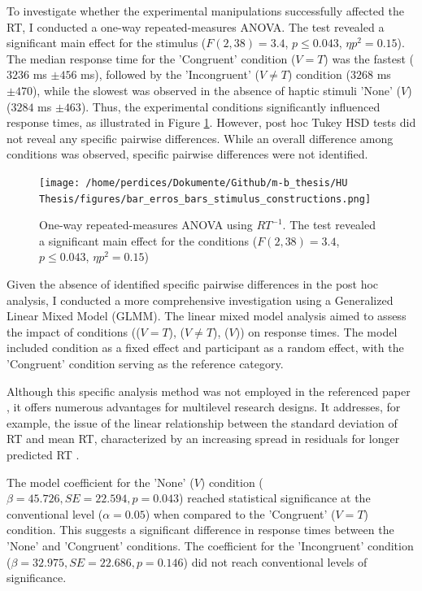 \documentclass[12pt,oneside,openright]{report}
\begin{document}
To investigate whether the experimental manipulations successfully affected the RT, I conducted a one-way repeated-measures ANOVA. The test revealed a significant main effect for the stimulus ($F(2,38) = 3.4$, $p \leq 0.043$, $\eta p^2 = 0.15$). The median response time for the 'Congruent' condition ($V=T$) was the fastest ($3236$ ms $\pm 456$ ms), followed by the 'Incongruent' ($V \neq T$) condition ($3268$ ms $\pm 470$), while the slowest was observed in the absence of haptic stimuli 'None' ($V$) ($3284$ ms $\pm 463$). Thus, the experimental conditions significantly influenced response times, as illustrated in Figure \ref{fig:error}. However, post hoc Tukey HSD tests did not reveal any specific pairwise differences. While an overall difference among conditions was observed, specific pairwise differences were not identified.

\begin{figure}[!ht]
    \centering
    \texttt{[image: /home/perdices/Dokumente/Github/m-b\_thesis/HU Thesis/figures/bar\_erros\_bars\_stimulus\_constructions.png]}
    \caption{One-way repeated-measures ANOVA using $RT^{-1}$. The test revealed a significant main effect for the conditions ($F(2,38) = 3.4$, $p \leq 0.043$, $\eta p^2 = 0.15$)}
    \label{fig:error}
\end{figure}

Given the absence of identified specific pairwise differences in the post hoc analysis, I conducted a more comprehensive investigation using a Generalized Linear Mixed Model (GLMM).
The linear mixed model analysis aimed to assess the impact of conditions (($V=T$), ($V \neq T$), ($V$)) on response times. The model included condition as a fixed effect and participant as a random effect, with the 'Congruent' condition serving as the reference category.

Although this specific analysis method was not employed in the referenced paper \parencite{SALTAFOSSI2023108642}, it offers numerous advantages for multilevel research designs. It addresses, for example, the issue of the linear relationship between the standard deviation of RT and mean RT, characterized by an increasing spread in residuals for longer predicted RT \parencite{Lo2015-fv}.

The model coefficient for the 'None' ($V$) condition ($\beta = 45.726, SE = 22.594, p = 0.043$) reached statistical significance at the conventional level ($\alpha =0.05 $) when compared to the 'Congruent' ($V=T$) condition. This suggests a significant difference in response times between the 'None' and 'Congruent' conditions. The coefficient for the 'Incongruent' condition ($\beta = 32.975, SE = 22.686, p = 0.146$) did not reach conventional levels of significance. 
\end{document}
